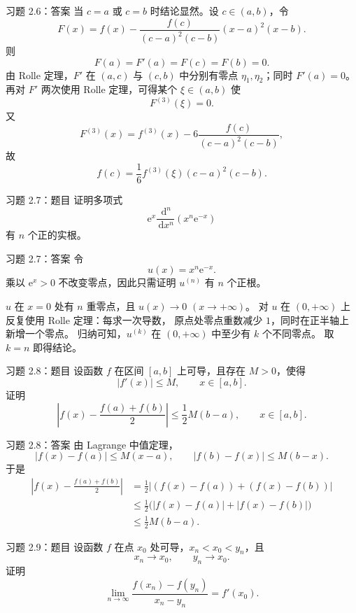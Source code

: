 \documentclass[aspectratio=169,10pt]{ctexbeamer}
\newcommand{\ee}{\mathrm{e}}
\newcommand{\dd}{\,\mathrm{d}}
\begin{document}
\begin{frame}{习题 2.6：答案}
\footnotesize
当 $c=a$ 或 $c=b$ 时结论显然。设 $c\in(a,b)$，令
\[
  F(x)=f(x)-\frac{f(c)}{(c-a)^2(c-b)}(x-a)^2(x-b).
\]
则
\[
  F(a)=F'(a)=F(c)=F(b)=0.
\]
由 Rolle 定理，$F'$ 在 $(a,c)$ 与 $(c,b)$ 中分别有零点
$\eta_1,\eta_2$；同时 $F'(a)=0$。
再对 $F'$ 两次使用 Rolle 定理，可得某个 $\xi\in(a,b)$ 使
\[
  F^{(3)}(\xi)=0.
\]
又
\[
  F^{(3)}(x)=f^{(3)}(x)-6\frac{f(c)}{(c-a)^2(c-b)},
\]
故
\[
  f(c)=\frac16 f^{(3)}(\xi)(c-a)^2(c-b).
\]
\end{frame}

\begin{frame}{习题 2.7：题目}
\small
证明多项式
\[
  \ee^x\frac{\dd^n}{\dd x^n}(x^n\ee^{-x})
\]
有 $n$ 个正的实根。
\end{frame}

\begin{frame}{习题 2.7：答案}
\small
令
\[
  u(x)=x^n\ee^{-x}.
\]
乘以 $\ee^x>0$ 不改变零点，因此只需证明 $u^{(n)}$ 有 $n$ 个正根。

$u$ 在 $x=0$ 处有 $n$ 重零点，且 $u(x)\to0$ $(x\to+\infty)$。
对 $u$ 在 $(0,+\infty)$ 上反复使用 Rolle 定理：每求一次导数，
原点处零点重数减少 $1$，同时在正半轴上新增一个零点。
归纳可知，$u^{(k)}$ 在 $(0,+\infty)$ 中至少有 $k$ 个不同零点。
取 $k=n$ 即得结论。
\end{frame}

\begin{frame}{习题 2.8：题目}
\small
设函数 $f$ 在区间 $[a,b]$ 上可导，且存在 $M>0$，使得
\[
  |f'(x)|\le M,\qquad x\in[a,b].
\]
证明
\[
  \left|f(x)-\frac{f(a)+f(b)}2\right|
  \le\frac12M(b-a),\qquad x\in[a,b].
\]
\end{frame}

\begin{frame}{习题 2.8：答案}
\small
由 Lagrange 中值定理，
\[
  |f(x)-f(a)|\le M(x-a),\qquad
  |f(b)-f(x)|\le M(b-x).
\]
于是
\[
\begin{aligned}
\left|f(x)-\frac{f(a)+f(b)}2\right|
&=\frac12\left|(f(x)-f(a))+(f(x)-f(b))\right|\\
&\le \frac12\bigl(|f(x)-f(a)|+|f(x)-f(b)|\bigr)\\
&\le\frac12M(b-a).
\end{aligned}
\]
\end{frame}

\begin{frame}{习题 2.9：题目}
\small
设函数 $f$ 在点 $x_0$ 处可导，$x_n<x_0<y_n$，且
\[
  x_n\to x_0,\qquad y_n\to x_0.
\]
证明
\[
  \lim_{n\to\infty}\frac{f(x_n)-f(y_n)}{x_n-y_n}=f'(x_0).
\]
\end{frame}
\end{document}
